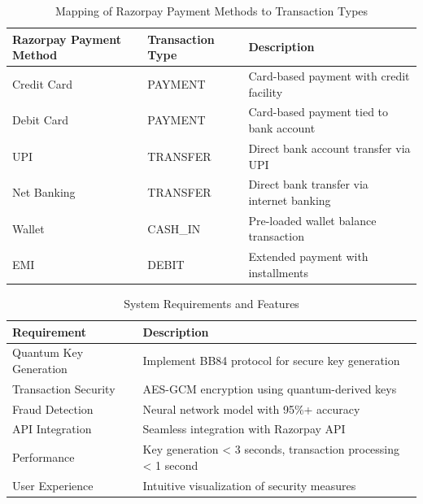 \begin{table}[!htb]
\small
\centering
\begin{tabular}{|p{3.5cm}|p{3.5cm}|p{5.5cm}|}
\hline
\textbf{Razorpay Payment Method} & \textbf{Transaction Type} & \textbf{Description} \\
\hline
Credit Card & PAYMENT & Card-based payment with credit facility \\
\hline
Debit Card & PAYMENT & Card-based payment tied to bank account \\
\hline
UPI & TRANSFER & Direct bank account transfer via UPI \\
\hline
Net Banking & TRANSFER & Direct bank transfer via internet banking \\
\hline
Wallet & CASH_IN & Pre-loaded wallet balance transaction \\
\hline
EMI & DEBIT & Extended payment with installments \\
\hline
\end{tabular}
\caption{Mapping of Razorpay Payment Methods to Transaction Types}
\label{table:razorpay_mapping}
\end{table}

\begin{table}[!htb]
\centering
\begin{tabular}{|p{4cm}|p{8cm}|}
\hline
\textbf{Requirement} & \textbf{Description} \\
\hline
Quantum Key Generation & Implement BB84 protocol for secure key generation \\
\hline
Transaction Security & AES-GCM encryption using quantum-derived keys \\
\hline
Fraud Detection & Neural network model with 95\%+ accuracy \\
\hline
API Integration & Seamless integration with Razorpay API \\
\hline
Performance & Key generation < 3 seconds, transaction processing < 1 second \\
\hline
User Experience & Intuitive visualization of security measures \\
\hline
\end{tabular}
\caption{System Requirements and Features}
\label{tab:requirements}
\end{table}

